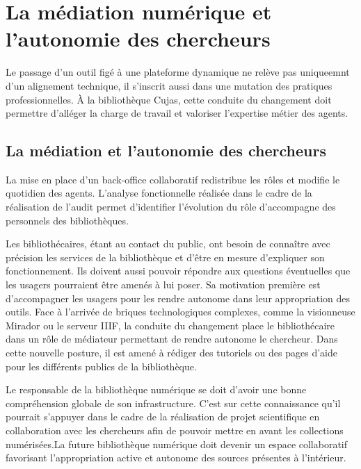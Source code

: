 \section[Médiation et autonomie]{La médiation numérique et l'autonomie des chercheurs}
Le passage d'un outil figé à une plateforme dynamique ne relève pas uniqueemnt d'un alignement technique, il s'inscrit aussi dans une mutation des pratiques professionnelles. À la bibliothèque Cujas, cette conduite du changement doit permettre d'alléger la charge de travail et valoriser l'expertise métier des agents.

\subsection{La médiation et l'autonomie des chercheurs}
La mise en place d'un back-office collaboratif redistribue les rôles et modifie le quotidien des agents. L'analyse fonctionnelle réalisée dans le cadre de la réalisation de l'audit permet d'identifier l'évolution du rôle d'accompagne des personnels des bibliothèques. 

Les bibliothécaires, étant au contact du public, ont besoin de connaître avec précision les services de la bibliothèque et d'être en mesure d'expliquer son fonctionnement. Ils doivent aussi pouvoir répondre aux questions éventuelles que les usagers pourraient être amenés à lui poser. Sa motivation première est d'accompagner les usagers pour les rendre autonome dans leur appropriation des outils. Face à l'arrivée de briques technologiques complexes, comme la visionneuse Mirador ou le serveur IIIF, la conduite du changement place le bibliothécaire dans un rôle de médiateur permettant de rendre autonome le chercheur. Dans cette nouvelle posture, il est amené à rédiger des tutoriels ou des pages d'aide pour les différents publics de la bibliothèque.

Le responsable de la bibliothèque numérique se doit d'avoir une bonne compréhension globale de son infrastructure. C'est sur cette connaissance qu'il pourrait s'appuyer dans le cadre de la réalisation de projet scientifique en collaboration avec les chercheurs afin de pouvoir mettre en avant les collections numérisées.La future bibliothèque numérique doit devenir un espace collaboratif favorisant l'appropriation active et autonome des sources présentes à l'intérieur.

